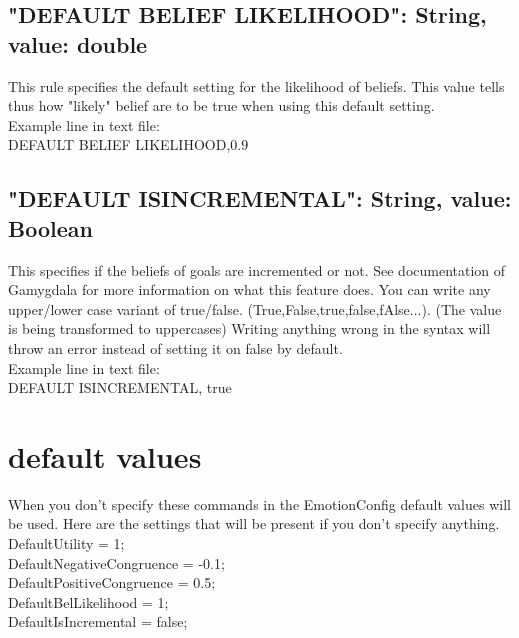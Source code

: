 \documentclass{scrartcl}
\begin{document}
\subsection*{"DEFAULT BELIEF LIKELIHOOD": String, value: double}
This rule specifies the default setting for the likelihood of beliefs. This value tells thus how "likely" belief are to be true when using this default setting.\\
Example line in text file:\\
DEFAULT BELIEF LIKELIHOOD,0.9\\

\subsection*{"DEFAULT ISINCREMENTAL": String, value: Boolean}
This specifies if the beliefs of goals are incremented or not. See documentation of Gamygdala for more information on what this feature does.
You can write any upper/lower case variant of true/false. (True,False,true,false,fAlse...). (The value is being transformed to uppercases)
Writing anything wrong in the syntax will throw an error instead of setting it on false by default.\\
Example line in text file:\\
DEFAULT ISINCREMENTAL, true\\

\pagebreak
\section*{default values}
When you don't specify these commands in the EmotionConfig default values will be used. Here are the settings that will be present if you don't specify anything.\\
DefaultUtility = 1;\\
DefaultNegativeCongruence = -0.1;\\
DefaultPositiveCongruence = 0.5;\\
DefaultBelLikelihood = 1;\\
DefaultIsIncremental = false;\\
\end{document}
